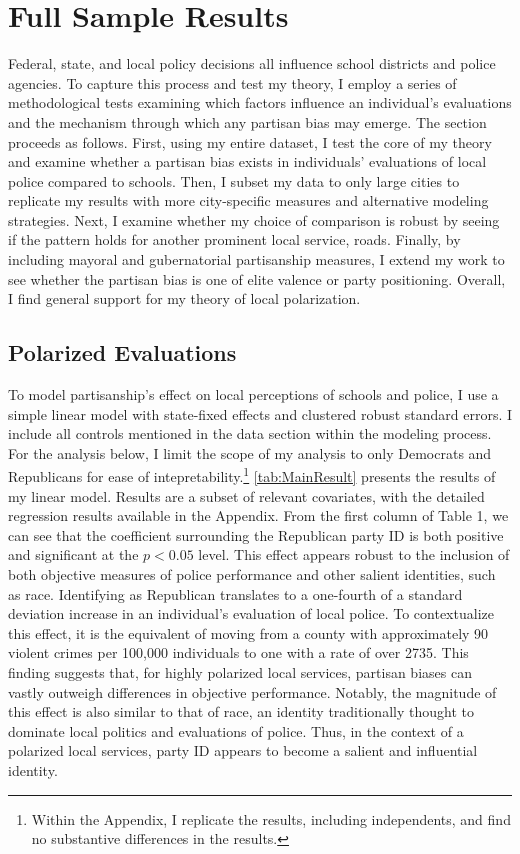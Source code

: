 \section{Full Sample Results}

Federal, state, and local policy decisions all influence school districts and police agencies. To capture this process and test my theory, I employ a series of methodological tests examining which factors influence an individual's evaluations and the mechanism through which any partisan bias may emerge. The section proceeds as follows. First, using my entire dataset, I test the core of my theory and examine whether a partisan bias exists in individuals' evaluations of local police compared to schools. Then, I subset my data to only large cities to replicate my results with more city-specific measures and alternative modeling strategies. Next, I examine whether my choice of comparison is robust by seeing if the pattern holds for another prominent local service, roads. Finally, by including mayoral and gubernatorial partisanship measures, I extend my work to see whether the partisan bias is one of elite valence or party positioning. Overall, I find general support for my theory of local polarization.

\subsection{Polarized Evaluations}
To model partisanship's effect on local perceptions of schools and police, I use a simple linear model with state-fixed effects and clustered robust standard errors. I include all controls mentioned in the data section within the modeling process. For the analysis below, I limit the scope of my analysis to only Democrats and Republicans for ease of intepretability.\footnote{Within the Appendix, I replicate the results, including independents, and find no substantive differences in the results.} \autoref{tab:MainResult} presents the results of my linear model. Results are a subset of relevant covariates, with the detailed regression results available in the Appendix. From the first column of Table 1, we can see that the coefficient surrounding the Republican party ID is both positive and significant at the $p<0.05$ level. This effect appears robust to the inclusion of both objective measures of police performance and other salient identities, such as race. Identifying as Republican translates to a one-fourth of a standard deviation increase in an individual's evaluation of local police. To contextualize this effect, it is the equivalent of moving from a county with approximately 90 violent crimes per 100,000 individuals to one with a rate of over 2735. This finding suggests that, for highly polarized local services, partisan biases can vastly outweigh differences in objective performance. Notably, the magnitude of this effect is also similar to that of race, an identity traditionally thought to dominate local politics and evaluations of police. Thus, in the context of a polarized local services, party ID appears to become a salient and influential identity.


